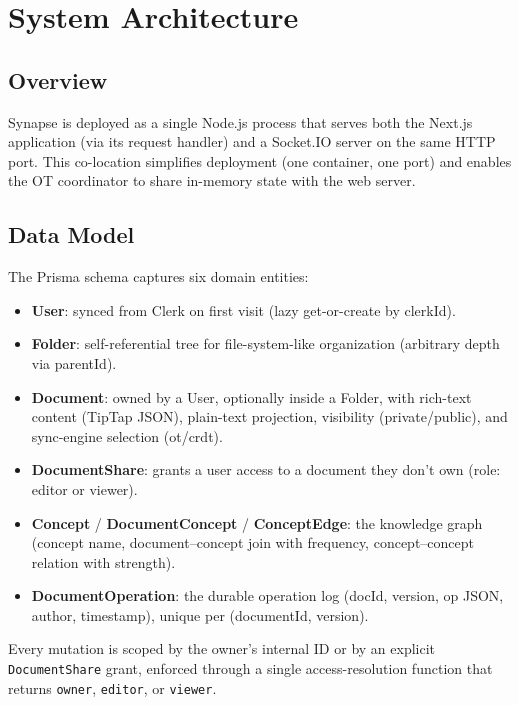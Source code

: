 \documentclass[conference]{IEEEtran}
\begin{document}
\section{System Architecture}\label{sec:architecture}

\subsection{Overview}

Synapse is deployed as a single Node.js process that serves both the Next.js application (via its request handler) and a Socket.IO server on the same HTTP port. This co-location simplifies deployment (one container, one port) and enables the OT coordinator to share in-memory state with the web server.

\subsection{Data Model}

The Prisma schema captures six domain entities:

\begin{itemize}
\item \textbf{User}: synced from Clerk on first visit (lazy get-or-create by clerkId).
\item \textbf{Folder}: self-referential tree for file-system-like organization (arbitrary depth via parentId).
\item \textbf{Document}: owned by a User, optionally inside a Folder, with rich-text content (TipTap JSON), plain-text projection, visibility (private/public), and sync-engine selection (ot/crdt).
\item \textbf{DocumentShare}: grants a user access to a document they don't own (role: editor or viewer).
\item \textbf{Concept} / \textbf{DocumentConcept} / \textbf{ConceptEdge}: the knowledge graph (concept name, document--concept join with frequency, concept--concept relation with strength).
\item \textbf{DocumentOperation}: the durable operation log (docId, version, op JSON, author, timestamp), unique per (documentId, version).
\end{itemize}

Every mutation is scoped by the owner's internal ID or by an explicit \texttt{DocumentShare} grant, enforced through a single access-resolution function that returns \texttt{owner}, \texttt{editor}, or \texttt{viewer}.
\end{document}
